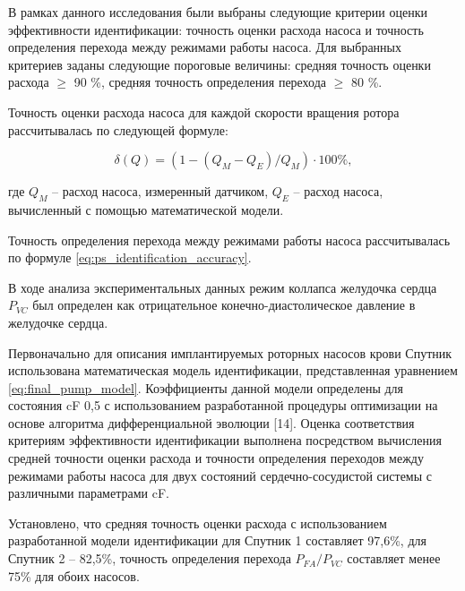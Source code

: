 

В рамках данного исследования были выбраны следующие критерии оценки эффективности идентификации: точность оценки расхода насоса и точность определения перехода между режимами работы насоса. Для выбранных критериев заданы следующие пороговые величины: средняя точность оценки расхода $\geq$ 90 \%, средняя точность определения перехода $\geq$ 80 \%. 

Точность оценки расхода насоса для каждой скорости вращения ротора рассчитывалась по следующей формуле:

\begin{equation}
	\delta(Q) = \left( 1 - (Q_M - Q_E)/Q_M \right) \cdot 100 \%,
\end{equation}

\noindent где $Q_M$ -- расход насоса, измеренный датчиком, $Q_E$ -- расход насоса, вычисленный с помощью математической модели. %

Точность определения перехода между режимами работы насоса рассчитывалась по формуле \eqref{eq:ps_identification_accuracy}. 

В ходе анализа экспериментальных данных режим коллапса желудочка сердца $P_{VC}$ был определен как отрицательное конечно-диастолическое давление в желудочке сердца. 

Первоначально для описания имплантируемых роторных насосов крови Спутник использована математическая модель идентификации, представленная уравнением \eqref{eq:final_pump_model}. Коэффициенты данной модели определены для состояния cF 0,5 с использованием разработанной процедуры оптимизации на основе алгоритма дифференциальной эволюции [14]. Оценка соответствия критериям эффективности идентификации выполнена посредством вычисления средней точности оценки расхода и точности определения переходов между режимами работы насоса для двух состояний сердечно-сосудистой системы с различными параметрами cF. 

Установлено, что средняя точность оценки расхода с использованием разработанной модели идентификации для Спутник 1 составляет 97,6\%, для Спутник 2 -- 82,5\%, точность определения перехода $P_{FA}/P_{VC}$ составляет менее 75\% для обоих насосов. 

